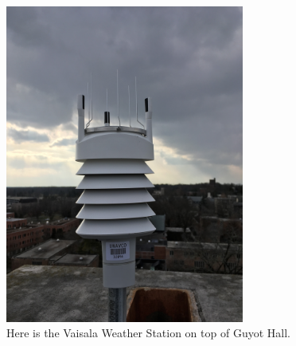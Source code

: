 \documentclass[11pt]{report}
\begin{document}
\begin{figure}[h]
	\centering
	\includegraphics[width = 0.7\textwidth]{Figures/weather_station.jpg}
	\caption[Vaisala Weather Station]{
		Here is the Vaisala Weather Station on top of Guyot Hall.  
		 }
\end{figure}
\end{document}
